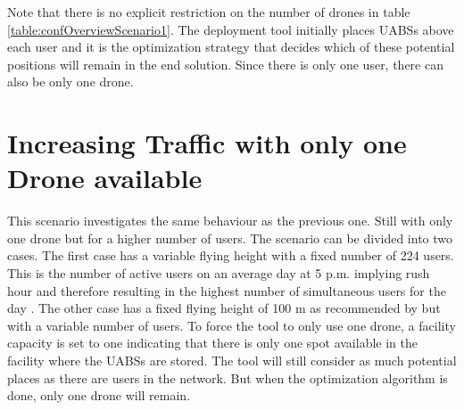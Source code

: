 Note that there is no explicit restriction on the number of drones in table \ref{table:confOverviewScenario1}. The deployment tool initially places 
\gls{UABS}s above each user and it is the optimization strategy that decides which of these potential positions will remain in the end solution.
Since there is only one user, there can also be only one drone.




\section{Increasing Traffic with only one Drone available}

This scenario investigates the same behaviour as the previous one. Still with only one drone but for a higher number of users. 
The scenario can be divided into two cases. The first case has a variable 
flying height with a fixed number of 224 users. This is the number of active users on an average day at 5 p.m. implying rush hour and therefore 
resulting in the highest number of simultaneous users for the day \cite{J2}. The other 
case has a fixed flying height of 100 m as recommended by \cite{J2} but with a variable number of users. To force the tool to only use one drone, a facility capacity is set to one 
indicating that there is only one spot available in the facility where the \gls{UABS}s are stored. The tool will still consider as much potential places 
as there are users in the network. But when the optimization algorithm is done, only one drone will remain.

